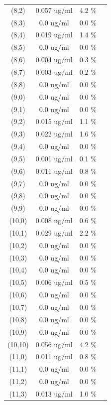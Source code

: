 \documentclass{article}
\begin{document}
\begin{tabular}{c c c c}
(8,2)&        0.057 ug/ml        &4.2 \%\\
(8,3)&        0.0 ug/ml        &0.0 \%\\
(8,4)&        0.019 ug/ml        &1.4 \%\\
(8,5)&        0.0 ug/ml        &0.0 \%\\
(8,6)&        0.004 ug/ml        &0.3 \%\\
(8,7)&        0.003 ug/ml        &0.2 \%\\
(8,8)&        0.0 ug/ml        &0.0 \%\\
(9,0)&        0.0 ug/ml        &0.0 \%\\
(9,1)&        0.0 ug/ml        &0.0 \%\\
(9,2)&        0.015 ug/ml        &1.1 \%\\
(9,3)&        0.022 ug/ml        &1.6 \%\\
(9,4)&        0.0 ug/ml        &0.0 \%\\
(9,5)&        0.001 ug/ml        &0.1 \%\\
(9,6)&        0.011 ug/ml        &0.8 \%\\
(9,7)&        0.0 ug/ml        &0.0 \%\\
(9,8)&        0.0 ug/ml        &0.0 \%\\
(9,9)&        0.0 ug/ml        &0.0 \%\\
(10,0)&        0.008 ug/ml        &0.6 \%\\
(10,1)&        0.029 ug/ml        &2.2 \%\\
(10,2)&        0.0 ug/ml        &0.0 \%\\
(10,3)&        0.0 ug/ml        &0.0 \%\\
(10,4)&        0.0 ug/ml        &0.0 \%\\
(10,5)&        0.006 ug/ml        &0.5 \%\\
(10,6)&        0.0 ug/ml        &0.0 \%\\
(10,7)&        0.0 ug/ml        &0.0 \%\\
(10,8)&        0.0 ug/ml        &0.0 \%\\
(10,9)&        0.0 ug/ml        &0.0 \%\\
(10,10)&        0.056 ug/ml        &4.2 \%\\
(11,0)&        0.011 ug/ml        &0.8 \%\\
(11,1)&        0.0 ug/ml        &0.0 \%\\
(11,2)&        0.0 ug/ml        &0.0 \%\\
(11,3)&        0.013 ug/ml        &1.0 \%\\

\end{tabular}
\end{document}
